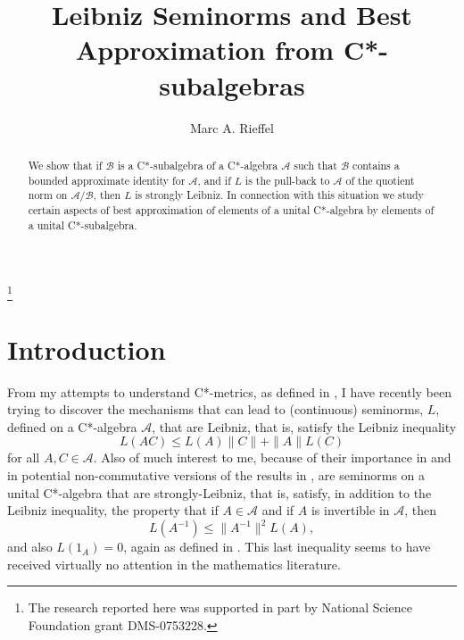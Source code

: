 \documentclass[12pt]{amsart}
\newcommand{\<}{\langle}
\renewcommand{\>}{\rangle}
\newcommand{\cA}{{\mathcal A}}
\newcommand{\cB}{{\mathcal B}}
\theoremstyle{definition}   %
\begin{document}
\title[Best Approximation from C*-subalgebras]{Leibniz Seminorms and 
Best Approximation from C*-subalgebras}
\author{Marc A. Rieffel}
\address{Department of Mathematics \\
University of California \\ Berkeley, CA 94720-3840}
\thanks{The research reported here was
supported in part by National Science Foundation grant DMS-0753228.}


\begin{abstract}
We show that if $\cB$ is a C*-subalgebra of a C*-algebra
$\cA$ such that $\cB$ contains a bounded approximate identity
for $\cA$, and if $L$ is the pull-back to $\cA$ of the 
quotient norm on $\cA/\cB$, then
$L$ is strongly Leibniz. In connection with this situation
we study certain aspects of best approximation of elements of
a unital C*-algebra by elements of a unital C*-subalgebra. 
\end{abstract}

\maketitle
\allowdisplaybreaks

\section{Introduction}

From my attempts to understand C*-metrics, as defined in \cite{R21}, I have
recently been trying to discover the mechanisms that can lead to (continuous) 
seminorms, $L$,
defined on a C*-algebra $\cA$, that are Leibniz, that is, satisfy the Leibniz 
inequality
\[
L(AC) \leq L(A)\|C\| +\|A\|L(C)
\]
for all $A, C \in \cA$. Also of much interest to me, because of their importance
in \cite{R17} and in potential non-commutative versions of the results in
\cite{R17}, are seminorms on a unital C*-algebra that are strongly-Leibniz,
that is, satisfy, in addition to the Leibniz inequality, the property that if $A \in \cA$
and if $A$ is invertible in $\cA$, then
\[
L(A^{-1}) \leq \|A^{-1}\|^2L(A)  ,
\]
and also $L(1_A) = 0$, again as defined in \cite{R21}. This last inequality seems
to have received virtually no attention in the mathematics literature.
\end{document}
